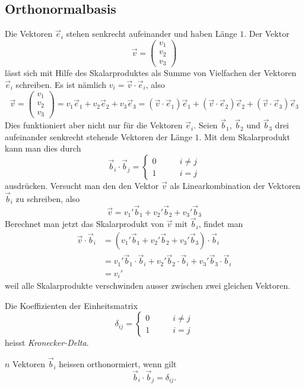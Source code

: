 \subsection{Orthonormalbasis}
Die Vektoren $\vec e_i$ stehen senkrecht aufeinander und haben
Länge $1$.
Der Vektor
\[
\vec v
=
\begin{pmatrix}v_1\\v_2\\v_3\end{pmatrix}
\]
lässt sich mit Hilfe des Skalarproduktes als Summe von Vielfachen
der Vektoren $\vec e_i$ schreiben.
Es ist nämlich $v_i=\vec v\cdot\vec e_i$, also
\[
\vec v
=
\begin{pmatrix}v_1\\v_2\\v_3\end{pmatrix}
=
v_1\vec e_1
+
v_2\vec e_2
+
v_3\vec e_3
=
(\vec v\cdot \vec e_1)\vec e_1
+
(\vec v\cdot \vec e_2)\vec e_2
+
(\vec v\cdot \vec e_3)\vec e_3
\]
Dies funktioniert aber nicht nur für die Vektoren $\vec e_i$.
Seien $\vec b_1$, $\vec b_2$ und $\vec b_3$ drei aufeinander senkrecht
stehende Vektoren der Länge $1$.
Mit dem Skalarprodukt kann man dies durch
\[
\vec b_i\cdot\vec b_j=\begin{cases}
0&\qquad i\ne j\\
1&\qquad i=j
\end{cases}
\]
ausdrücken.
Versucht man den den Vektor $\vec v$ als Linearkombination
der Vektoren $\vec b_i$ zu schreiben, also
\[
\vec v
=
v_1'\vec b_1
+
v_2'\vec b_2
+
v_3'\vec b_3
\]
Berechnet man jetzt das Skalarprodukt von $\vec v$ mit $\vec b_i$,
findet man
\begin{align*}
\vec v\cdot \vec b_i
&=
(
v_1'\vec b_1
+
v_2'\vec b_2
+
v_3'\vec b_3
)\cdot
\vec b_i
\\
&=
v_1'\vec b_1\cdot\vec b_i
+
v_2'\vec b_2\cdot\vec b_i
+
v_3'\vec b_3\cdot\vec b_i
\\
&=v_i'
\end{align*}
weil alle Skalarprodukte verschwinden ausser zwischen
zwei gleichen Vektoren.

\begin{definition} Die Koeffizienten der Einheitsmatrix
\[
\delta_{ij}=
\begin{cases}
0&\qquad i\ne j\\
1&\qquad i=j
\end{cases}
\]
heisst {\em Kronecker-Delta}.
\end{definition}

\begin{definition}
$n$ Vektoren $\vec b_i$ heissen orthonormiert, wenn gilt
\[
\vec b_i\cdot\vec b_j=\delta_{ij}.
\]
\end{definition}

